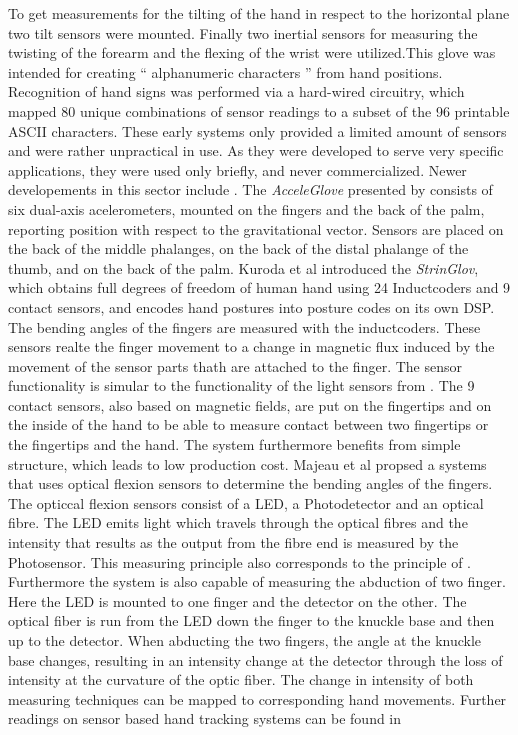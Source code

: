 To get measurements  for the tilting of the hand in respect to the horizontal plane two tilt sensors were mounted. Finally two inertial sensors for measuring the twisting of the forearm and the flexing of the wrist were utilized.This glove was intended for creating “ alphanumeric characters ” from hand positions. Recognition of hand signs was performed via a hard-wired circuitry, which mapped 80 unique combinations of sensor readings to a subset of the 96 printable ASCII characters.
These early systems only provided a limited amount of sensors and were rather unpractical in use. As they were developed to serve very specific applications,  they were used only briefly, and never commercialized.
Newer developements in this sector include \cite{Kuroda.2004,HernandezRebollar.2002,Majeau.2012}. The \textit{AcceleGlove} presented by \cite{HernandezRebollar.2002} consists of six dual-axis acelerometers, mounted on the fingers and the back of the palm, reporting position with respect to the gravitational vector. Sensors are placed on the back of the middle phalanges, on the back of the distal phalange of the thumb, and on the back of the palm.
Kuroda et al \cite{Kuroda.2004} introduced the \textit{StrinGlov}, which obtains full degrees of freedom of human hand using 24 Inductcoders and 9 contact sensors, and encodes hand postures into posture codes on its own DSP. The bending angles of the fingers are measured with the inductcoders. These sensors realte the finger movement to a change in magnetic flux induced by the movement of the sensor parts thath are attached to the finger. The sensor functionality is simular to the functionality of the light sensors from \cite{ThomasA.DeFanti.1977}. The 9 contact sensors, also based on magnetic fields,  are put on the fingertips and on the inside of the hand to be able to measure contact between two fingertips or the fingertips and the hand. The system furthermore benefits from simple structure, which leads to low production cost. 
Majeau et al \cite{Majeau.2012} propsed a systems that uses optical flexion sensors to determine the bending angles of the fingers. The opticcal flexion sensors consist of a LED, a Photodetector and an optical fibre. The LED emits light which travels through the optical fibres and the intensity that results as the output from the fibre end is measured by the Photosensor. This measuring principle also corresponds to the principle of \cite{ThomasA.DeFanti.1977}. Furthermore the system is also capable of measuring the abduction of two finger. Here the LED is mounted to one finger and the detector on the other. The optical fiber is run from the LED down the finger to the knuckle base and then up to the detector. When abducting the two fingers, the angle at the knuckle base changes, resulting in an intensity change at the detector through the loss of intensity at the curvature of the optic fiber.
The change in intensity of both measuring techniques can be mapped to corresponding hand movements.
Further readings on sensor based hand tracking systems can be found in \cite{Dipietro.2008,Sturman.1994}

